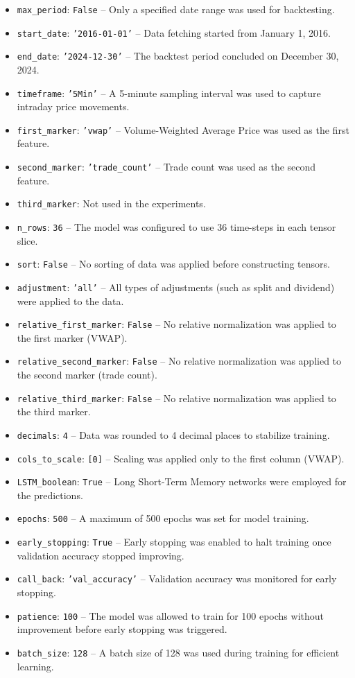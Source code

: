 \documentclass[letterpaper]{article}
\begin{document}
\begin{itemize} [left=0pt]
  \item \texttt{max\_period}: \texttt{False} – Only a specified date range was used for backtesting. 
  \item \texttt{start\_date}: \texttt{'2016-01-01'} – Data fetching started from January 1, 2016. 
  \item \texttt{end\_date}: \texttt{'2024-12-30'} – The backtest period concluded on December 30, 2024. 
  \item \texttt{timeframe}: \texttt{'5Min'} – A 5-minute sampling interval was used to capture intraday price movements. 
  \item \texttt{first\_marker}: \texttt{'vwap'} – Volume-Weighted Average Price was used as the first feature. 
  \item \texttt{second\_marker}: \texttt{'trade\_count'} – Trade count was used as the second feature. 
  \item \texttt{third\_marker}: Not used in the experiments. 
  \item \texttt{n\_rows}: \texttt{36} – The model was configured to use 36 time-steps in each tensor slice. 
  \item \texttt{sort}: \texttt{False} – No sorting of data was applied before constructing tensors. 
  \item \texttt{adjustment}: \texttt{'all'} – All types of adjustments (such as split and dividend) were applied to the data. 
  \item \texttt{relative\_first\_marker}: \texttt{False} – No relative normalization was applied to the first marker (VWAP). 
  \item \texttt{relative\_second\_marker}: \texttt{False} – No relative normalization was applied to the second marker (trade count). 
  \item \texttt{relative\_third\_marker}: \texttt{False} – No relative normalization was applied to the third marker. 
  \item \texttt{decimals}: \texttt{4} – Data was rounded to 4 decimal places to stabilize training.  
  \item \texttt{cols\_to\_scale}: \texttt{[0]} – Scaling was applied only to the first column (VWAP). 
  \item \texttt{LSTM\_boolean}: \texttt{True} – Long Short-Term Memory networks were employed for the predictions. 
  \item \texttt{epochs}: \texttt{500} – A maximum of 500 epochs was set for model training. 
  \item \texttt{early\_stopping}: \texttt{True} – Early stopping was enabled to halt training once validation accuracy stopped improving. 
  \item \texttt{call\_back}: \texttt{'val\_accuracy'} – Validation accuracy was monitored for early stopping. 
  \item \texttt{patience}: \texttt{100} – The model was allowed to train for 100 epochs without improvement before early stopping was triggered. 
  \item \texttt{batch\_size}: \texttt{128} – A batch size of 128 was used during training for efficient learning. 
\end{itemize}
\end{document}
